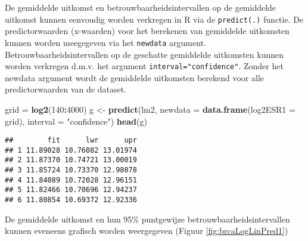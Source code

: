 \documentclass[12pt,dutch,coursenotes]{book}
\newenvironment{Shaded}{\begin{snugshade}}{\end{snugshade}}
\newcommand{\KeywordTok}[1]{\textcolor[rgb]{0.13,0.29,0.53}{\textbf{#1}}}
\newcommand{\DataTypeTok}[1]{\textcolor[rgb]{0.13,0.29,0.53}{#1}}
\newcommand{\DecValTok}[1]{\textcolor[rgb]{0.00,0.00,0.81}{#1}}
\newcommand{\StringTok}[1]{\textcolor[rgb]{0.31,0.60,0.02}{#1}}
\newcommand{\OperatorTok}[1]{\textcolor[rgb]{0.81,0.36,0.00}{\textbf{#1}}}
\newcommand{\NormalTok}[1]{#1}
\theoremstyle{definition}
\theoremstyle{definition}
\theoremstyle{definition}
\theoremstyle{remark}
\begin{document}
De gemiddelde uitkomst en betrouwbaarheidsintervallen op de gemiddelde
uitkomst kunnen eenvoudig worden verkregen in R via de
\texttt{predict(.)} functie. De predictorwaarden (x-waarden) voor het
berekenen van gemiddelde uitkomsten kunnen worden meegegeven via het
\texttt{newdata} argument. Betrouwbaarheidsintervallen op de geschatte
gemiddelde uitkomsten kunnen worden verkregen d.m.v. het argument
\texttt{interval="confidence"}. Zonder het newdata argument wordt de
gemiddelde uitkomsten berekend voor alle predictorwaarden van de
dataset.

\begin{Shaded}
\begin{Highlighting}[]
\NormalTok{grid =}\StringTok{ }\KeywordTok{log2}\NormalTok{(}\DecValTok{140}\OperatorTok{:}\DecValTok{4000}\NormalTok{)}
\NormalTok{g <-}\StringTok{ }\KeywordTok{predict}\NormalTok{(lm2, }\DataTypeTok{newdata =} \KeywordTok{data.frame}\NormalTok{(}\DataTypeTok{log2ESR1 =}\NormalTok{ grid), }
    \DataTypeTok{interval =} \StringTok{"confidence"}\NormalTok{)}
\KeywordTok{head}\NormalTok{(g)}
\end{Highlighting}
\end{Shaded}

\begin{verbatim}
##        fit      lwr      upr
## 1 11.89028 10.76082 13.01974
## 2 11.87370 10.74721 13.00019
## 3 11.85724 10.73370 12.98078
## 4 11.84089 10.72028 12.96151
## 5 11.82466 10.70696 12.94237
## 6 11.80854 10.69372 12.92336
\end{verbatim}

De gemiddelde uitkomst en hun 95\% puntgewijze
betrouwbaarheidsintervallen kunnen eveneens grafisch worden weergegeven
(Figuur \ref{fig:brcaLogLinPred1})

\begin{Shaded}
\end{Shaded}
\end{document}
